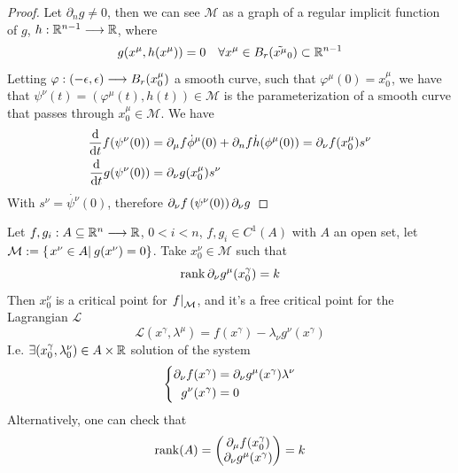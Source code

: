 \documentclass[../complete.tex]{subfiles}
\begin{document}
\begin{proof}
	Let $\partial_ng\ne0$, then we can see $\mathcal{M}$ as a graph of a regular implicit function of $g$, $h:\R^{n-1}\fto\R$, where
	\begin{equation*}
		g(x^\mu,h(x^\mu))=0\quad\forall x^\mu\in B_r(\tilde{x^\mu}_0)\subset\R^{n-1}
	\end{equation*}
	Letting $\varphi:(-\epsilon,\epsilon)\fto B_r(x^\mu_0)$ a smooth curve, such that $\varphi^\mu(0)=x^\mu_0$, we have that $\psi^\nu(t)=(\varphi^\mu(t),h(t))\in\mathcal{M}$ is the parameterization of a smooth curve that passes through $x^\mu_0\in\mathcal{M}$. We have
	\begin{equation*}
		\begin{aligned}
			\derivative{t}f(\psi^\nu(0))&=\del_\mu f\dot{\phi}^\mu(0)+\del_nf\dot{h}(\phi^\mu(0))=\del_\nu f(x^\mu_0)s^\nu\\
			\derivative{t}g(\psi^\nu(0))&=\del_\nu g(x^\mu_0)s^\nu
		\end{aligned}
	\end{equation*}
	With $s^\nu=\dot{\psi^\nu}(0)$, therefore $\del_\nu f\left(\psi^\nu(0)\right)\del_\nu g$
\end{proof}
\begin{thm}
	Let $f,g_i:A\subseteq\R^n\fto\R$, $0<i<n$, $f,g_i\in C^1(A)$ with $A$ an open set, let $\mathcal{M}:=\{\derin{x^\nu\in A}g(x^\nu)=0\}$. Take $x^\nu_0\in\mathcal{M}$ such that
	\begin{equation*}
		\rank\del_\nu g^\mu(x^\gamma_0)=k
	\end{equation*}
	Then $x^\nu_0$ is a critical point for $\derin[\mathcal{M}]{f}$, and it's a free critical point for the Lagrangian $\mathcal{L}$
	\begin{equation*}
		\mathcal{L}(x^\gamma,\lambda^\mu)=f(x^\gamma)-\lambda_\nu g^\nu(x^\gamma)
	\end{equation*}
	I.e. $\exists(x^\gamma_0,\lambda^\nu_0)\in A\times\R$ solution of the system
	\begin{equation*}
		\left\{ \begin{aligned}
				\del_\nu f(x^\gamma)&=\del_\nu g^\mu(x^\gamma)\lambda^\nu\\
				g^\nu(x^\gamma)&=0
		\end{aligned}\right.
	\end{equation*}
	Alternatively, one can check that
	\begin{equation*}
		\rank(A)=\begin{pmatrix}\del_\mu f(x^\gamma_0)\\\del_\nu g^\mu(x^\gamma)\end{pmatrix}=k
	\end{equation*}
\end{thm}
\end{document}
